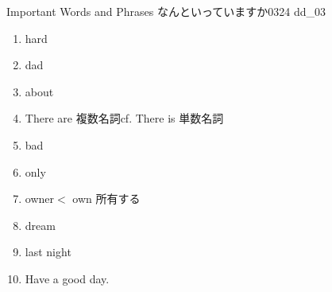 \documentclass[aspectratio=169,xcolor={dvipsnames,table}]{beamer}
\begin{document}
\begin{frame}[plain,t]{Important Words and Phrases}
  なんといっていますか\hfill{\tiny 0324}\,{\scriptsize {}\,dd\_03}\pause

  \Large
  \begin{enumerate}[<+- |alert@+>]\setlength{\itemsep}{-1.8pt}
    \item hard
    \item dad%
    \item about
    \item There are 複数名詞\hfill{\small cf. There is 単数名詞}
    \item bad
    \item only
    \item owner\hfill{\small $<$ own  所有する}
    \item dream
    \item last night
    \item Have a good day.
  \end{enumerate}

\end{frame}
\end{document}
